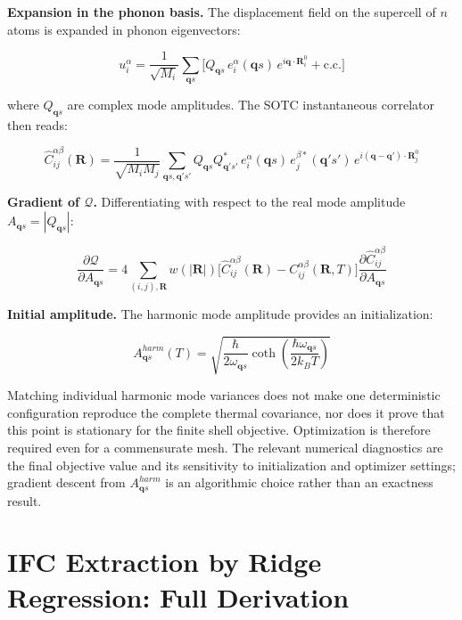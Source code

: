 \documentclass[aps,prb,reprint,amsmath,amssymb,floatfix]{revtex4-2}
\begin{document}
\textbf{Expansion in the phonon basis.} The displacement field on the
supercell of \(n\) atoms is expanded in phonon eigenvectors:

\begin{equation*}
u_i^\alpha = \frac{1}{\sqrt{M_i}}\sum_{\mathbf{q}s}\bigl[Q_{\mathbf{q}s}\,e_i^\alpha(\mathbf{q}s)\,e^{i\mathbf{q}\cdot\mathbf{R}_i^0} + \text{c.c.}\bigr]
\end{equation*}

where \(Q_{\mathbf{q}s}\) are complex mode amplitudes. The SOTC
instantaneous correlator then reads:

{\scriptsize
\begin{equation*}
\hat{C}_{ij}^{\alpha\beta}(\mathbf{R}) = \frac{1}{\sqrt{M_iM_j}}\sum_{\mathbf{q}s,\mathbf{q}'s'} Q_{\mathbf{q}s}Q_{\mathbf{q}'s'}^*\, e_i^\alpha(\mathbf{q}s)\,e_j^{\beta*}(\mathbf{q}'s')\, e^{i(\mathbf{q}-\mathbf{q}')\cdot\mathbf{R}_j^0}
\end{equation*}
}

\textbf{Gradient of \(\mathcal{Q}\).} Differentiating with respect to
the real mode amplitude \(A_{\mathbf{q}s} = |Q_{\mathbf{q}s}|\):

{\small
\begin{equation*}
\frac{\partial\mathcal{Q}}{\partial A_{\mathbf{q}s}} = 4\sum_{(i,j),\mathbf{R}} w(|\mathbf{R}|)\bigl[\hat{C}_{ij}^{\alpha\beta}(\mathbf{R}) - C_{ij}^{\alpha\beta}(\mathbf{R},T)\bigr]\frac{\partial\hat{C}_{ij}^{\alpha\beta}}{\partial A_{\mathbf{q}s}}
\end{equation*}
}

\textbf{Initial amplitude.} The harmonic mode amplitude provides an
initialization:

\begin{equation*}
A_{\mathbf{q}s}^{harm}(T) = \sqrt{\frac{\hbar}{2\omega_{\mathbf{q}s}}\coth\!\left(\frac{\hbar\omega_{\mathbf{q}s}}{2k_BT}\right)}
\end{equation*}

Matching individual harmonic mode variances does not make one deterministic
configuration reproduce the complete thermal covariance, nor does it prove
that this point is stationary for the finite shell objective. Optimization is therefore required even for a commensurate mesh. The relevant
numerical diagnostics are the final objective value and its sensitivity to
initialization and optimizer settings; gradient descent from
\(A_{\mathbf{q}s}^{harm}\) is an algorithmic choice rather than an exactness
result.

\section{IFC Extraction by Ridge Regression: Full
Derivation}\label{appendix-d-ifc-extraction-by-ridge-regression-full-derivation}
\end{document}
